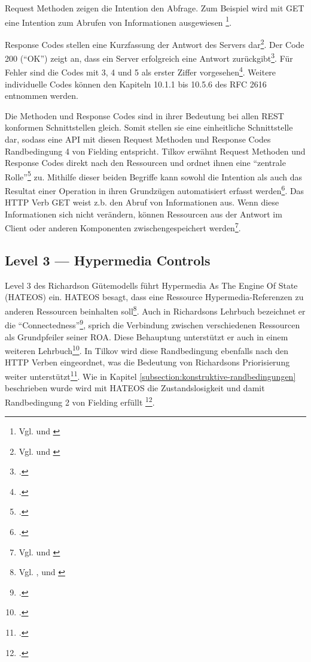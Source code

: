 Request Methoden zeigen die Intention den Abfrage. Zum Beispiel wird mit GET eine Intention zum Abrufen von Informationen ausgewiesen \footnote{Vgl. \cite[S. 6]{richardson_restful_2007} und \cite[S. 28]{masse_rest_2012}}.

Response Codes stellen eine Kurzfassung der Antwort des Servers dar\footnote{Vgl. \cite[S. 237]{franch_detection_2014} und \cite[S. 28]{masse_rest_2012}}. Der Code 200 (“OK”) zeigt an, dass ein Server erfolgreich eine Antwort zurückgibt\footcite[Vgl. ][S. 137]{richardson_restful_2007}. Für Fehler sind die Codes mit 3, 4 und 5 als erster Ziffer vorgesehen\footcite[Vgl. ][S. 139]{richardson_restful_2007}. Weitere individuelle Codes können den Kapiteln 10.1.1 bis 10.5.6 des RFC 2616 entnommen werden. 

Die Methoden und Response Codes sind in ihrer Bedeutung bei allen REST konformen Schnittstellen gleich. Somit stellen sie eine einheitliche Schnittstelle dar, sodass eine API mit diesen Request Methoden und Response Codes Randbedingung 4 von Fielding entspricht. Tilkov erwähnt Request Methoden und Response Codes direkt nach den Ressourcen und ordnet ihnen eine “zentrale Rolle”\footcite[Vgl. ][S. 53]{tilkov_rest_2015} zu. Mithilfe dieser beiden Begriffe kann sowohl die Intention als auch das Resultat einer Operation in ihren Grundzügen automatisiert erfasst werden\footcite[Vgl. ][S. 36]{richardson_restful_2013}. Das HTTP Verb GET weist z.b. den Abruf von Informationen aus. Wenn diese Informationen sich nicht verändern, können Ressourcen aus der Antwort im Client oder anderen Komponenten zwischengespeichert werden\footnote{Vgl. \cite{fowler_richardson_2010} und \cite[S. 219]{richardson_restful_2007}}.

\subsection{Level 3 — Hypermedia Controls}\label{subsection:level-3}

Level 3 des Richardson Gütemodells führt Hypermedia As The Engine Of State (HATEOS) ein. HATEOS besagt, dass eine Ressource Hypermedia-Referenzen zu anderen Ressourcen beinhalten soll\footnote{Vgl. \cite[Vgl. ][]{fowler_richardson_2010}, \cite[Vgl. ][]{richardson_justice_2008} und \cite[Vgl. ][S. 5]{pautasso_restful_2014}}. Auch in Richardsons Lehrbuch bezeichnet er die “Connectedness”\footcite[Vgl. ][S. 105]{richardson_restful_2007}, sprich die Verbindung zwischen verschiedenen Ressourcen als Grundpfeiler seiner ROA. Diese Behauptung unterstützt er auch in einem weiteren Lehrbuch\footcite[Vgl. ][S. XV]{richardson_restful_2013}. In Tilkov wird diese Randbedingung ebenfalls nach den HTTP Verben eingeordnet, was die Bedeutung von Richardsons Priorisierung weiter unterstützt\footcite[Vgl. ][S. 75]{tilkov_rest_2015}. Wie in Kapitel \ref{subsection:konstruktive-randbedingungen} beschrieben wurde wird mit HATEOS die Zustandslosigkeit und damit Randbedingung 2 von Fielding erfüllt \footcite[Vgl. ][S. 75]{tilkov_rest_2015}. 

